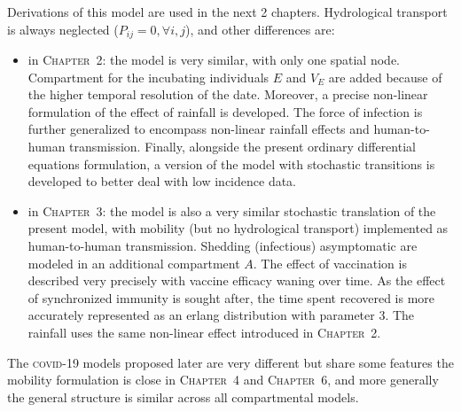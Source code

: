 Derivations of this model are used in the next 2 chapters. Hydrological transport is always neglected ($P_{ij}=0, \forall i,j$), and other differences are:
\begin{itemize}
	\item in \textsc{Chapter~2}: the model is very similar, with only one spatial node. Compartment for the incubating individuals $E$ and $V_E$ are added because of the higher temporal resolution of the date. Moreover, a precise non-linear formulation of the effect of rainfall is developed. The force of infection is further generalized to encompass non-linear rainfall effects and human-to-human transmission. Finally, alongside the present ordinary differential equations formulation, a version of the model with stochastic transitions is developed to better deal with low incidence data. 
	\item in \textsc{Chapter~3}: the model is also a very similar stochastic translation of the present model, with mobility (but no hydrological transport) implemented as human-to-human transmission. Shedding (infectious) asymptomatic are modeled in an additional compartment $A$. The effect of vaccination is described very precisely with vaccine efficacy waning over time. As the effect of synchronized immunity is sought after,  the time spent recovered is more accurately represented as an erlang distribution with parameter 3. The rainfall uses the same non-linear effect introduced in \textsc{Chapter~2}. 
\end{itemize}
The \textsc{covid}-19 models proposed later are very different but share some features \eg the mobility formulation is close in \textsc{Chapter~4} and \textsc{Chapter~6}, and more generally the general structure is similar across all compartmental models.
